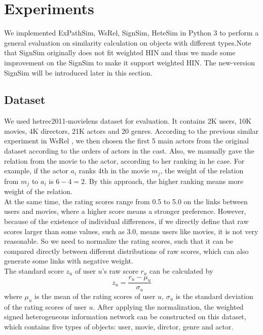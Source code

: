 \documentclass{acm_proc_article-csis8101}
\begin{document}
\section{Experiments}
We implemented ExPathSim, WsRel, SignSim, HeteSim in Python 3 to perform a general evaluation on similarity calculation on objects with different types.Note that SignSim originally does not fit weighted HIN and thus we made some improvement on the SignSim to make it support weighted HIN. The new-version SignSim will be introduced later in this section.
\subsection{Dataset}
We used hetrec2011-movielens\cite{cantador2011second} dataset for evaluation. It contains 2K users, 10K movies, 4K directors, 21K actors and 20 genres. According to the previous similar experiment in WsRel \cite{zhu2017measuring}, we then chosen the ﬁrst 5 main actors from the original dataset according to the orders of actors in the cast. Also, we manually gave the relation from the movie to the actor, according to her ranking in he case. For example, if the actor $a_{i}$ ranks 4th in the movie $m_{j}$, the weight of the relation from $m_{j}$ to $a_{i}$ is $6 - 4=2$. By this approach, the higher ranking means more weight of the relation. \\

At the same time, the rating scores range from 0.5 to 5.0 on the links between users and movies, where a higher score means a stronger preference. However, because of the existence of individual differences, if we directly deﬁne that raw scores larger than some values, such as 3.0, means users like movies, it is not very reasonable. So we need to normalize the rating scores, such that it can be compared directly between different distributions of raw scores, which can also generate some links with negative weight. \\
The standard score $z_{u}$ of user $u$'s raw score $r_{u}$ can be calculated by
\begin{equation}
z_{u} = \dfrac{r_{u} - \mu_{u}}{\sigma_{u}}
\end{equation}
where $\mu_{u}$ is the mean of the rating scores of user $u$, $\sigma_{u}$ is the standard deviation of the rating scores of user $u$. After applying the normalization, the weighted signed heterogeneous information network can be constructed on this dataset, which contains five types of objects: user, movie, dirctor, genre and actor.\\
\end{document}
